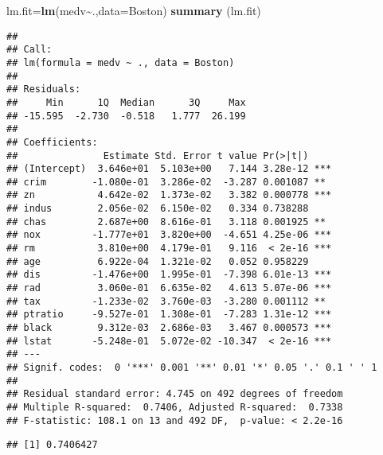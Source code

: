 \documentclass[
]{article}
\newenvironment{Shaded}{\begin{snugshade}}{\end{snugshade}}
\newcommand{\AttributeTok}[1]{\textcolor[rgb]{0.13,0.29,0.53}{#1}}
\newcommand{\FunctionTok}[1]{\textcolor[rgb]{0.13,0.29,0.53}{\textbf{#1}}}
\newcommand{\NormalTok}[1]{#1}
\newcommand{\OtherTok}[1]{\textcolor[rgb]{0.56,0.35,0.01}{#1}}
\newcommand{\SpecialCharTok}[1]{\textcolor[rgb]{0.81,0.36,0.00}{\textbf{#1}}}
\begin{document}
\begin{Shaded}
\begin{Highlighting}[]
\NormalTok{lm.fit}\OtherTok{=}\FunctionTok{lm}\NormalTok{(medv}\SpecialCharTok{\textasciitilde{}}\NormalTok{.,}\AttributeTok{data=}\NormalTok{Boston)}
\FunctionTok{summary}\NormalTok{ (lm.fit)}
\end{Highlighting}
\end{Shaded}

\begin{verbatim}
## 
## Call:
## lm(formula = medv ~ ., data = Boston)
## 
## Residuals:
##     Min      1Q  Median      3Q     Max 
## -15.595  -2.730  -0.518   1.777  26.199 
## 
## Coefficients:
##               Estimate Std. Error t value Pr(>|t|)    
## (Intercept)  3.646e+01  5.103e+00   7.144 3.28e-12 ***
## crim        -1.080e-01  3.286e-02  -3.287 0.001087 ** 
## zn           4.642e-02  1.373e-02   3.382 0.000778 ***
## indus        2.056e-02  6.150e-02   0.334 0.738288    
## chas         2.687e+00  8.616e-01   3.118 0.001925 ** 
## nox         -1.777e+01  3.820e+00  -4.651 4.25e-06 ***
## rm           3.810e+00  4.179e-01   9.116  < 2e-16 ***
## age          6.922e-04  1.321e-02   0.052 0.958229    
## dis         -1.476e+00  1.995e-01  -7.398 6.01e-13 ***
## rad          3.060e-01  6.635e-02   4.613 5.07e-06 ***
## tax         -1.233e-02  3.760e-03  -3.280 0.001112 ** 
## ptratio     -9.527e-01  1.308e-01  -7.283 1.31e-12 ***
## black        9.312e-03  2.686e-03   3.467 0.000573 ***
## lstat       -5.248e-01  5.072e-02 -10.347  < 2e-16 ***
## ---
## Signif. codes:  0 '***' 0.001 '**' 0.01 '*' 0.05 '.' 0.1 ' ' 1
## 
## Residual standard error: 4.745 on 492 degrees of freedom
## Multiple R-squared:  0.7406, Adjusted R-squared:  0.7338 
## F-statistic: 108.1 on 13 and 492 DF,  p-value: < 2.2e-16
\end{verbatim}

\begin{Shaded}
\end{Shaded}

\begin{verbatim}
## [1] 0.7406427
\end{verbatim}

\begin{Shaded}
\end{Shaded}
\end{document}

